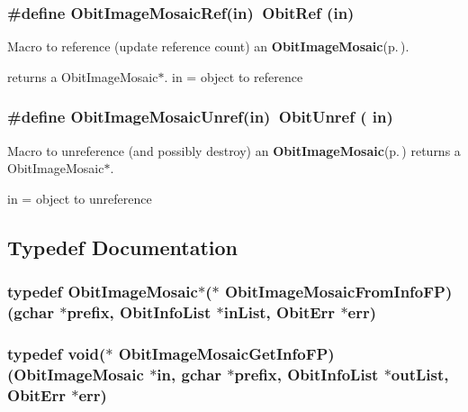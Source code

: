 \subsubsection{\setlength{\rightskip}{0pt plus 5cm}\#define Obit\-Image\-Mosaic\-Ref(in)\ Obit\-Ref (in)}\label{ObitImageMosaic_8h_a1}


Macro to reference (update reference count) an {\bf Obit\-Image\-Mosaic}{\rm (p.\,\pageref{structObitImageMosaic})}. 

returns a Obit\-Image\-Mosaic$\ast$. in = object to reference 
\subsubsection{\setlength{\rightskip}{0pt plus 5cm}\#define Obit\-Image\-Mosaic\-Unref(in)\ Obit\-Unref ( in)}\label{ObitImageMosaic_8h_a0}


Macro to unreference (and possibly destroy) an {\bf Obit\-Image\-Mosaic}{\rm (p.\,\pageref{structObitImageMosaic})} returns a Obit\-Image\-Mosaic$\ast$. 

in = object to unreference 

\subsection{Typedef Documentation}
\subsubsection{\setlength{\rightskip}{0pt plus 5cm}typedef {\bf Obit\-Image\-Mosaic}$\ast$($\ast$ {\bf Obit\-Image\-Mosaic\-From\-Info\-FP})(gchar $\ast$prefix, {\bf Obit\-Info\-List} $\ast$in\-List, {\bf Obit\-Err} $\ast$err)}\label{ObitImageMosaic_8h_a3}


\subsubsection{\setlength{\rightskip}{0pt plus 5cm}typedef void($\ast$ {\bf Obit\-Image\-Mosaic\-Get\-Info\-FP})({\bf Obit\-Image\-Mosaic} $\ast$in, gchar $\ast$prefix, {\bf Obit\-Info\-List} $\ast$out\-List, {\bf Obit\-Err} $\ast$err)}\label{ObitImageMosaic_8h_a4}




